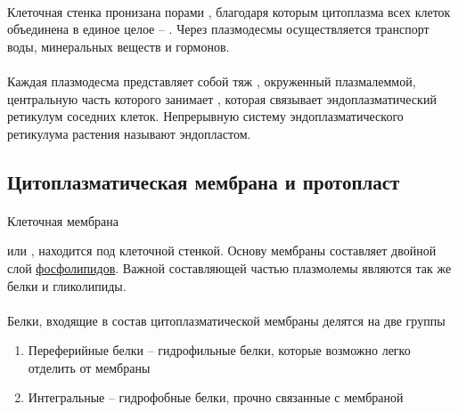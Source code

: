 \paragraph*{}Клеточная стенка пронизана порами , благодаря которым цитоплазма всех клеток объединена в единое целое -- . Через плазмодесмы осуществляется транспорт воды, минеральных веществ и гормонов.


\paragraph*{}Каждая плазмодесма представляет собой тяж , окруженный плазмалеммой, центральную часть которого занимает , которая связывает эндоплазматический ретикулум соседних клеток. Непрерывную систему эндоплазматического ретикулума растения называют эндопластом.


\subsection*{Цитоплазматическая мембрана и протопласт}

\paragraph*{}\hypertarget{plasmolema}{Клеточная мембрана} или , находится под клеточной стенкой. Основу мембраны составляет двойной слой \hyperlink{plipids}{фосфолипидов}. Важной составляющей частью плазмолемы являются так же белки и гликолипиды. 

\paragraph*{}Белки, входящие в состав цитоплазматической мембраны делятся на две группы

\begin{enumerate}
	\item Переферийные белки -- гидрофильные белки, которые возможно легко отделить от мембраны
	\item Интегральные -- гидрофобные белки, прочно связанные с мембраной \cite{fzr_ermakov}
\end{enumerate}

